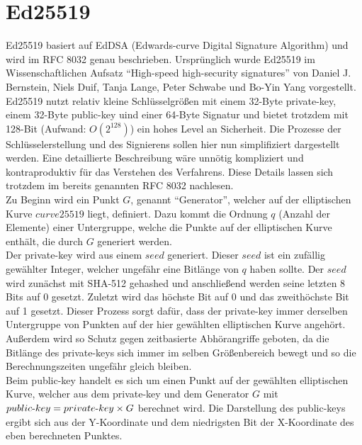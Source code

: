\documentclass[thesis=bachelor,faculty=cb]{hsmw-thesis}
\begin{document}
\section{Ed25519}
Ed25519 basiert auf EdDSA (Edwards-curve Digital Signature Algorithm) und wird im RFC 8032\cite{ed25519} genau beschrieben. Ursprünglich wurde Ed25519 im Wissenschaftlichen Aufsatz \enquote{High-speed high-security signatures} \cite{ed25519_paper} von   Daniel J. Bernstein, Niels Duif, Tanja Lange, Peter Schwabe und Bo-Yin Yang vorgestellt.
\\[1cm]
Ed25519 nutzt relativ kleine Schlüsselgrößen mit einem 32-Byte private-key, einem 32-Byte public-key uind einer 64-Byte Signatur und bietet trotzdem mit 128-Bit (Aufwand: \begin{math}O(2^{128})\end{math}) ein hohes Level an Sicherheit. Die Prozesse der Schlüsselerstellung und des Signierens sollen hier nun simplifiziert \cite{nakov} dargestellt werden. Eine detaillierte Beschreibung wäre unnötig kompliziert und kontraproduktiv für das Verstehen des Verfahrens. Diese Details lassen sich trotzdem im bereits genannten RFC 8032 nachlesen. 
\\[1cm]
Zu Beginn wird ein Punkt $G$, genannt \enquote{Generator}, welcher auf der elliptischen Kurve $curve25519$ liegt, definiert. Dazu kommt die Ordnung $q$ (Anzahl der Elemente) einer Untergruppe, welche die Punkte auf der elliptischen Kurve enthält, die durch $G$ generiert werden.
\\[1cm]
Der private-key wird aus einem $seed$ generiert. Dieser $seed$ ist ein zufällig gewählter Integer, welcher ungefähr eine Bitlänge von $q$ haben sollte.
Der $seed$ wird zunächst mit SHA-512 gehashed und anschließend werden seine letzten 8 Bits auf 0 gesetzt. Zuletzt wird das höchste Bit auf 0 und das zweithöchste Bit auf 1 gesetzt. Dieser Prozess sorgt dafür, dass der private-key immer derselben Untergruppe von Punkten auf der hier gewählten elliptischen Kurve angehört.
Außerdem wird so Schutz gegen zeitbasierte Abhörangriffe geboten, da die Bitlänge des private-keys sich immer im selben Größenbereich bewegt und
so die Berechnungszeiten ungefähr gleich bleiben.
\\[1cm]
Beim public-key handelt es sich um einen Punkt auf der gewählten elliptischen Kurve, welcher aus dem private-key und dem Generator $G$ mit 
$public{\text -}key = private{\text -}key \times G$ berechnet wird. Die Darstellung des public-keys ergibt sich aus der Y-Koordinate und dem niedrigsten Bit der X-Koordinate des eben berechneten Punktes.
\end{document}
